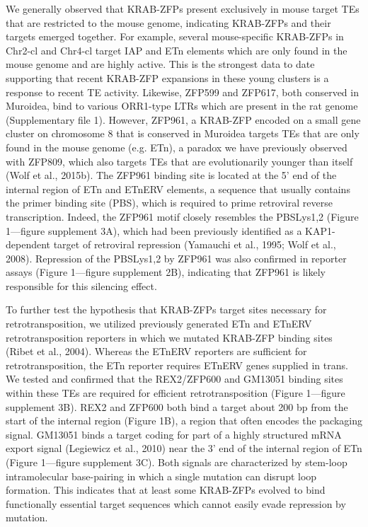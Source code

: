 \documentclass[11pt,a4paper]{article}
\begin{document}
We generally observed that KRAB-ZFPs present exclusively in mouse target TEs that are restricted to the mouse genome, indicating KRAB-ZFPs and their targets emerged together. For example, several mouse-specific KRAB-ZFPs in Chr2-cl and Chr4-cl target IAP and ETn elements which are only found in the mouse genome and are highly active. This is the strongest data to date supporting that recent KRAB-ZFP expansions in these young clusters is a response to recent TE activity. Likewise, ZFP599 and ZFP617, both conserved in Muroidea, bind to various ORR1-type LTRs which are present in the rat genome (Supplementary file 1). However, ZFP961, a KRAB-ZFP encoded on a small gene cluster on chromosome 8 that is conserved in Muroidea targets TEs that are only found in the mouse genome (e.g. ETn), a paradox we have previously observed with ZFP809, which also targets TEs that are evolutionarily younger than itself (Wolf et al., 2015b). The ZFP961 binding site is located at the 5’ end of the internal region of ETn and ETnERV elements, a sequence that usually contains the primer binding site (PBS), which is required to prime retroviral reverse transcription. Indeed, the ZFP961 motif closely resembles the PBSLys1,2 (Figure 1—figure supplement 3A), which had been previously identified as a KAP1-dependent target of retroviral repression (Yamauchi et al., 1995; Wolf et al., 2008). Repression of the PBSLys1,2 by ZFP961 was also confirmed in reporter assays (Figure 1—figure supplement 2B), indicating that ZFP961 is likely responsible for this silencing effect.

To further test the hypothesis that KRAB-ZFPs target sites necessary for retrotransposition, we utilized previously generated ETn and ETnERV retrotransposition reporters in which we mutated KRAB-ZFP binding sites (Ribet et al., 2004). Whereas the ETnERV reporters are sufficient for retrotransposition, the ETn reporter requires ETnERV genes supplied in trans. We tested and confirmed that the REX2/ZFP600 and GM13051 binding sites within these TEs are required for efficient retrotransposition (Figure 1—figure supplement 3B). REX2 and ZFP600 both bind a target about 200 bp from the start of the internal region (Figure 1B), a region that often encodes the packaging signal. GM13051 binds a target coding for part of a highly structured mRNA export signal (Legiewicz et al., 2010) near the 3’ end of the internal region of ETn (Figure 1—figure supplement 3C). Both signals are characterized by stem-loop intramolecular base-pairing in which a single mutation can disrupt loop formation. This indicates that at least some KRAB-ZFPs evolved to bind functionally essential target sequences which cannot easily evade repression by mutation.
\end{document}
